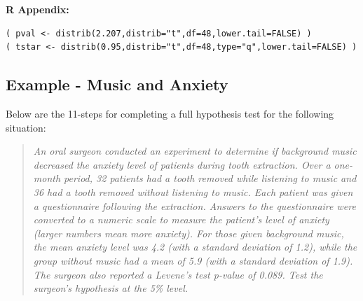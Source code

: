 \documentclass[10pt,openany]{book}\usepackage[]{graphicx}\usepackage[]{color}
\makeatletter
\newenvironment{kframe}{%
 \def\at@end@of@kframe{}%
 \ifinner\ifhmode%
  \def\at@end@of@kframe{\end{minipage}}%
  \begin{minipage}{\columnwidth}%
 \fi\fi%
 \def\FrameCommand##1{\hskip\@totalleftmargin \hskip-\fboxsep
 \colorbox{shadecolor}{##1}\hskip-\fboxsep
     \hskip-\linewidth \hskip-\@totalleftmargin \hskip\columnwidth}%
 \MakeFramed {\advance\hsize-\width
   \@totalleftmargin\z@ \linewidth\hsize
   \@setminipage}}%
 {\par\unskip\endMakeFramed%
 \at@end@of@kframe}
\newenvironment{knitrout}{}{} %
\makeatother
\begin{document}
\begin{minipage}{\textwidth}
\textbf{R Appendix:}
\vspace{-6pt}
\begin{knitrout}
\color{fgcolor}\begin{kframe}
\begin{verbatim}
( pval <- distrib(2.207,distrib="t",df=48,lower.tail=FALSE) )
( tstar <- distrib(0.95,distrib="t",df=48,type="q",lower.tail=FALSE) )
\end{verbatim}
\end{kframe}
\end{knitrout}
\end{minipage}


\vspace*{12pt}
\subsection{Example - Music and Anxiety}
Below are the 11-steps  for completing a full hypothesis test for the following situation:
\vspace{-4pt}
\begin{quote}
\textsl{An oral surgeon conducted an experiment to determine if background music decreased the anxiety level of patients during tooth extraction. Over a one-month period, 32 patients had a tooth removed while listening to music and 36 had a tooth removed without listening to music. Each patient was given a questionnaire following the extraction. Answers to the questionnaire were converted to a numeric scale to measure the patient's level of anxiety (larger numbers mean more anxiety). For those given background music, the mean anxiety level was 4.2 (with a standard deviation of 1.2), while the group without music had a mean of 5.9 (with a standard deviation of 1.9). The surgeon also reported a Levene's test p-value of 0.089. Test the surgeon's hypothesis at the 5\% level.}
\end{quote}
\end{document}
